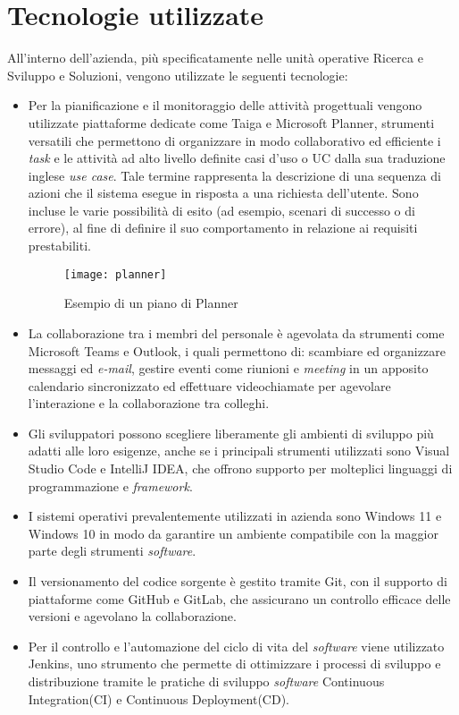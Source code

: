 \section{Tecnologie utilizzate}
All'interno dell'azienda, più specificatamente nelle unità operative Ricerca e Sviluppo e Soluzioni, vengono utilizzate le seguenti tecnologie: 
\begin{itemize}
    \item Per la pianificazione e il monitoraggio delle attività progettuali vengono utilizzate piattaforme dedicate come Taiga e Microsoft Planner, strumenti versatili che permettono di organizzare in modo collaborativo ed efficiente i \emph{task} e le attività ad alto livello definite casi d'uso o UC dalla sua traduzione inglese \emph{use case}. Tale termine rappresenta la descrizione di una sequenza di azioni che il sistema esegue in risposta a una richiesta dell'utente. Sono incluse le varie possibilità di esito (ad esempio, scenari di successo o di errore), al fine di definire il suo comportamento in relazione ai requisiti prestabiliti. 
    \begin{figure}[htbp] 
        \centering 
        \texttt{[image: planner]}
        \caption{Esempio di un piano di Planner} 
        \label{fig:planner}
    \end{figure}
    \item La collaborazione tra i membri del personale è agevolata da strumenti come Microsoft Teams e Outlook, i quali permettono di: scambiare ed organizzare messaggi ed \emph{e-mail}, gestire eventi come riunioni e \emph{meeting} in un apposito calendario sincronizzato ed effettuare videochiamate per agevolare l'interazione e la collaborazione tra colleghi. 
    \item Gli sviluppatori possono scegliere liberamente gli ambienti di sviluppo più adatti alle loro esigenze, anche se i principali strumenti utilizzati sono Visual Studio Code e IntelliJ IDEA, che offrono supporto per molteplici linguaggi di programmazione e \emph{framework}. 
    \item I sistemi operativi prevalentemente utilizzati in azienda sono Windows 11 e Windows 10 in modo da garantire un ambiente compatibile con la maggior parte degli strumenti \emph{software}. 
    \item Il versionamento del codice sorgente è gestito tramite Git, con il supporto di piattaforme come GitHub e GitLab, che assicurano un controllo efficace delle versioni e agevolano la collaborazione. 
    \item Per il controllo e l'automazione del ciclo di vita del \emph{software} viene utilizzato Jenkins, uno strumento che permette di ottimizzare i processi di sviluppo e distribuzione tramite le pratiche di sviluppo \emph{software} \gls{Continuous Integration}(CI) e \gls{Continuous Deployment}(CD).\\

\end{itemize}
